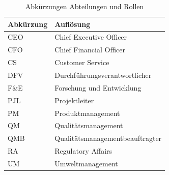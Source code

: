 \documentclass[a4paper,12pt]{report}
\begin{document}
\begin{table}[ht]
\begin{center}
\begin{tabular}{|p{}|p{}|}
\hline
Abkürzung & Auflösung\\
\hline\hline
CEO & Chief Executive Officer\\
\hline
CFO & Chief Financial Officer\\
\hline
CS & Customer Service\\
\hline
DFV & Durchführungsverantwortlicher\\
\hline
F\&E & Forschung und Entwicklung\\
\hline
PJL & Projektleiter\\
\hline
PM & Produktmanagement\\
\hline
QM & Qualitätsmanagement\\
\hline
QMB & Qualitätsmanagementbeauftragter\\
\hline
RA & Regulatory Affairs\\
\hline
UM & Umweltmanagement\\
\hline
\end{tabular}
\caption[Abkürzungen Abteilungen und Rollen]{Abkürzungen Abteilungen und Rollen}
\label{tab:abkuerzungen_abt_rollen}
\end{center}
\end{table}
\end{document}
